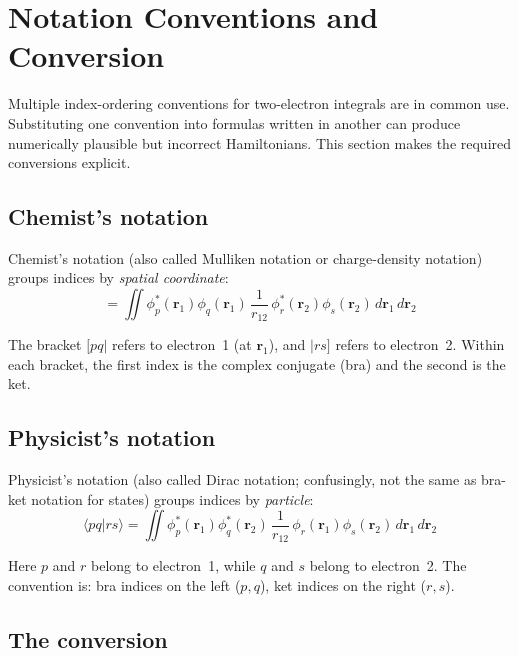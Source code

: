 \documentclass[aps,prb,preprint,longbibliography,nofootinbib]{revtex4-2}
\begin{document}
\section{Notation Conventions and Conversion}
\label{sec:notation}

Multiple index-ordering conventions for two-electron integrals are in
common use.  Substituting one convention into formulas written in
another can produce numerically plausible but incorrect Hamiltonians.
This section makes the required conversions explicit.

\subsection{Chemist's notation}

Chemist's notation (also called Mulliken notation or charge-density
notation) groups indices by \emph{spatial coordinate}:
\begin{equation}
[pq|rs] = \iint
  \phi_p^*(\mathbf{r}_1)\phi_q(\mathbf{r}_1)\,
  \frac{1}{r_{12}}\,
  \phi_r^*(\mathbf{r}_2)\phi_s(\mathbf{r}_2)\,
  d\mathbf{r}_1\, d\mathbf{r}_2
\end{equation}

The bracket $[pq|$ refers to electron~1 (at $\mathbf{r}_1$), and
$|rs]$ refers to electron~2.  Within each bracket, the first index is
the complex conjugate (bra) and the second is the ket.

\subsection{Physicist's notation}

Physicist's notation (also called Dirac notation; confusingly, not the
same as bra-ket notation for states) groups indices by \emph{particle}:
\begin{equation}
\langle pq|rs\rangle = \iint
  \phi_p^*(\mathbf{r}_1)\phi_q^*(\mathbf{r}_2)\,
  \frac{1}{r_{12}}\,
  \phi_r(\mathbf{r}_1)\phi_s(\mathbf{r}_2)\,
  d\mathbf{r}_1\, d\mathbf{r}_2
\end{equation}

Here $p$ and $r$ belong to electron~1, while $q$ and $s$ belong to
electron~2.  The convention is: bra indices on the left ($p, q$), ket
indices on the right ($r, s$).

\subsection{The conversion}
\end{document}
